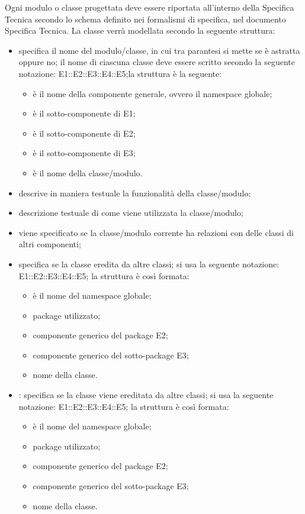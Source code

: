 Ogni modulo o classe progettata deve essere riportata all'interno della Specifica Tecnica secondo lo schema definito nei formalismi di specifica, nel documento Specifica Tecnica. La classe verrà modellata secondo la seguente struttura:
\begin{itemize}
\item {}specifica il nome del  modulo/classe, in cui tra parantesi si mette se è astratta oppure no; il nome di ciascuna classe deve essere scritto secondo la seguente notazione: E1::E2::E3::E4::E5;la struttura è la seguente:
\begin{itemize}
\item {}è il nome della componente generale, ovvero il namespace globale;
\item {}è il sotto-componente di E1;
\item {}è il sotto-componente di E2;
\item {}è il sotto-componente di E3;
\item {}è il nome della classe/modulo.
\end{itemize}
\item {}descrive in maniera testuale la funzionalità della classe/modulo;
\item {}descrizione testuale di come viene utilizzata la classe/modulo;
\item {}viene specificato se la classe/modulo corrente ha relazioni con delle classi di altri componenti;
\item {}specifica se la classe eredita da altre classi; si usa la seguente notazione: E1::E2::E3::E4::E5; la struttura è così formata:
\begin{itemize}
\item {}è il nome del namespace globale;
\item {}package utilizzato;
\item {}componente generico del package E2;
\item {}componente generico del sotto-package E3;
\item {}nome della classe.
\end{itemize}
\item {}: specifica se la classe viene ereditata da altre classi; si usa la seguente notazione: E1::E2::E3::E4::E5; la struttura è così formata:
\begin{itemize}
\item {}è il nome del namespace globale;
\item {}package utilizzato;
\item {}componente generico del package E2;
\item {}componente generico del sotto-package E3;
\item {}nome della classe.
\end{itemize}
\end{itemize}

